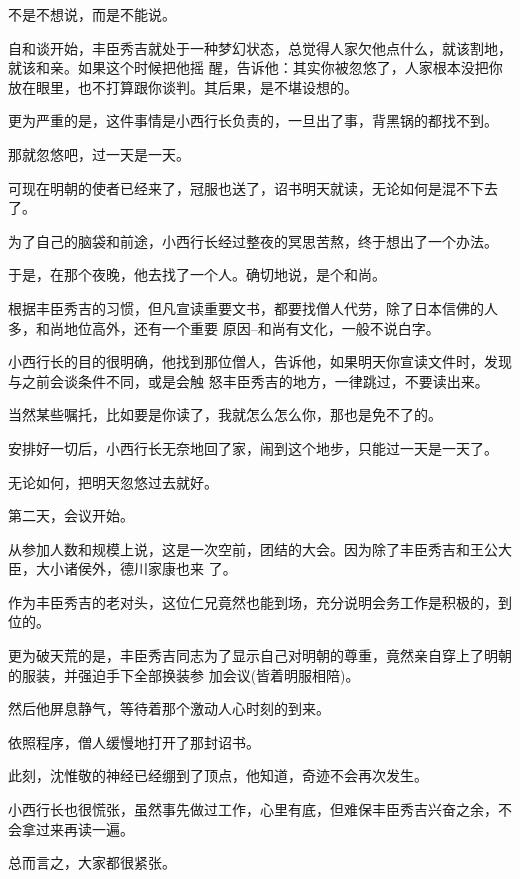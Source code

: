\documentclass[11pt,a4paper,onecolumn]{article}
\begin{document}
不是不想说，而是不能说。

自和谈开始，丰臣秀吉就处于一种梦幻状态，总觉得人家欠他点什么，就该割地，就该和亲。如果这个时候把他摇
醒，告诉他：其实你被忽悠了，人家根本没把你放在眼里，也不打算跟你谈判。其后果，是不堪设想的。

更为严重的是，这件事情是小西行长负责的，一旦出了事，背黑锅的都找不到。

那就忽悠吧，过一天是一天。

可现在明朝的使者已经来了，冠服也送了，诏书明天就读，无论如何是混不下去了。

为了自己的脑袋和前途，小西行长经过整夜的冥思苦熬，终于想出了一个办法。

于是，在那个夜晚，他去找了一个人。确切地说，是个和尚。

根据丰臣秀吉的习惯，但凡宣读重要文书，都要找僧人代劳，除了日本信佛的人多，和尚地位高外，还有一个重要
原因--和尚有文化，一般不说白字。

小西行长的目的很明确，他找到那位僧人，告诉他，如果明天你宣读文件时，发现与之前会谈条件不同，或是会触
怒丰臣秀吉的地方，一律跳过，不要读出来。

当然某些嘱托，比如要是你读了，我就怎么怎么你，那也是免不了的。

安排好一切后，小西行长无奈地回了家，闹到这个地步，只能过一天是一天了。

无论如何，把明天忽悠过去就好。

第二天，会议开始。

从参加人数和规模上说，这是一次空前，团结的大会。因为除了丰臣秀吉和王公大臣，大小诸侯外，德川家康也来
了。

作为丰臣秀吉的老对头，这位仁兄竟然也能到场，充分说明会务工作是积极的，到位的。

更为破天荒的是，丰臣秀吉同志为了显示自己对明朝的尊重，竟然亲自穿上了明朝的服装，并强迫手下全部换装参
加会议(皆着明服相陪)。

然后他屏息静气，等待着那个激动人心时刻的到来。

依照程序，僧人缓慢地打开了那封诏书。

此刻，沈惟敬的神经已经绷到了顶点，他知道，奇迹不会再次发生。

小西行长也很慌张，虽然事先做过工作，心里有底，但难保丰臣秀吉兴奋之余，不会拿过来再读一遍。

总而言之，大家都很紧张。

\section[\thesection]{}
\end{document}
